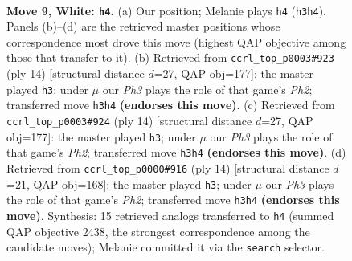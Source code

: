 \documentclass[11pt]{article}
\begin{document}
\clearpage

\begin{figure}[p]\centering
\begin{subfigure}{0.46\textwidth}\centering
\resizebox{\linewidth}{!}{%
\newchessgame
\chessboard[
  setfen={r1bq1rk1/1pp2pp1/2np1n2/p1b1p2p/2B1P3/2PP1N1P/PP3PP1/RNBQR1K1 w - - 0 9},
  showmover=false,
  pgfstyle=straightmove, color=movearrow, markmove={h3-h4}
]}
\caption{}
\end{subfigure}\hfill
\begin{subfigure}{0.46\textwidth}\centering
\resizebox{\linewidth}{!}{%
\newchessgame
\chessboard[
  setfen={r1bq1rk1/1pp2ppp/p1np1n2/2b1p3/2B1P3/2PP1N2/PP3PPP/RNBQR1K1 w - - 2 8},
  showmover=false,
  pgfstyle=straightmove, color=movearrow, markmove={h2-h3}
]}
\caption{}
\end{subfigure}
\\[4pt]
\begin{subfigure}{0.46\textwidth}\centering
\resizebox{\linewidth}{!}{%
\newchessgame
\chessboard[
  setfen={r1bq1rk1/1pp2ppp/p1np1n2/2b1p3/2B1P3/2PP1N2/PP3PPP/RNBQR1K1 w - - 2 8},
  showmover=false,
  pgfstyle=straightmove, color=movearrow, markmove={h2-h3}
]}
\caption{}
\end{subfigure}\hfill
\begin{subfigure}{0.46\textwidth}\centering
\resizebox{\linewidth}{!}{%
\newchessgame
\chessboard[
  setfen={r1bq1rk1/1pp2ppp/2np1n2/p1b1p3/2B1P3/2PP1N2/PP3PPP/RNBQR1K1 w - - 0 8},
  showmover=false,
  pgfstyle=straightmove, color=movearrow, markmove={h2-h3}
]}
\caption{}
\end{subfigure}
\caption{\textbf{Move 9, White: \texttt{h4}.} (a) Our position; Melanie plays \texttt{h4} (\texttt{h3h4}). Panels (b)--(d) are the retrieved master positions whose correspondence most drove this move (highest QAP objective among those that transfer to it). (b) Retrieved from \texttt{ccrl\_top\_p0003\#923} (ply 14) [structural distance $d$=27, QAP obj=177]: the master played \texttt{h3}; under $\mu$ our \emph{Ph3} plays the role of that game's \emph{Ph2}; transferred move \texttt{h3h4} \textbf{(endorses this move)}. (c) Retrieved from \texttt{ccrl\_top\_p0003\#924} (ply 14) [structural distance $d$=27, QAP obj=177]: the master played \texttt{h3}; under $\mu$ our \emph{Ph3} plays the role of that game's \emph{Ph2}; transferred move \texttt{h3h4} \textbf{(endorses this move)}. (d) Retrieved from \texttt{ccrl\_top\_p0000\#916} (ply 14) [structural distance $d$=21, QAP obj=168]: the master played \texttt{h3}; under $\mu$ our \emph{Ph3} plays the role of that game's \emph{Ph2}; transferred move \texttt{h3h4} \textbf{(endorses this move)}. Synthesis: 15 retrieved analogs transferred to \texttt{h4} (summed QAP objective 2438, the strongest correspondence among the candidate moves); Melanie committed it via the \texttt{search} selector.}
\label{fig:thought-m16}
\end{figure}
\end{document}
